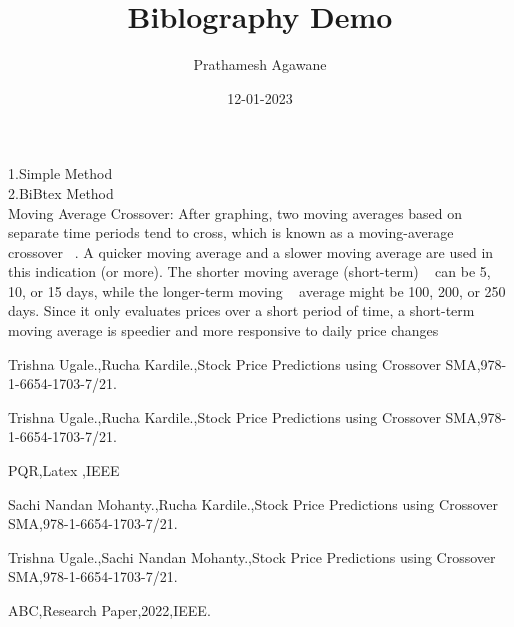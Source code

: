 \documentclass[11pt,a4paper]{report}
\author{Prathamesh Agawane}
\title{Biblography Demo}
\date{12-01-2023}
\begin{document}
\maketitle

1.Simple Method\\
2.BiBtex Method\\

Moving Average Crossover: After graphing, two 
moving averages based on separate time periods tend to cross, 
which is known as a moving-average crossover ~\cite{abc}. A quicker 
moving average and a slower moving average are used in this 
indication (or more). The shorter moving average (short-term) ~\cite{pqr}
can be 5, 10, or 15 days, while the longer-term moving ~\cite{aa,trishna}
average might be 100, 200, or 250 days. Since it only 
evaluates prices over a short period of time, a short-term 
moving average is speedier and more responsive to daily 
price changes ~\cite{trishna,sachi,rucha}


\begin{thebibliography} {}

Trishna Ugale.,Rucha Kardile.,Stock Price Predictions using Crossover SMA,978-1-6654-1703-7/21.

 Trishna Ugale.,Rucha Kardile.,Stock Price Predictions using Crossover SMA,978-1-6654-1703-7/21.

 PQR,Latex ,IEEE

 Sachi Nandan Mohanty.,Rucha Kardile.,Stock Price Predictions using Crossover SMA,978-1-6654-1703-7/21.

 Trishna Ugale.,Sachi Nandan Mohanty.,Stock Price Predictions using Crossover SMA,978-1-6654-1703-7/21.

 ABC,Research Paper,2022,IEEE.



\end{thebibliography} 
\end{document}
